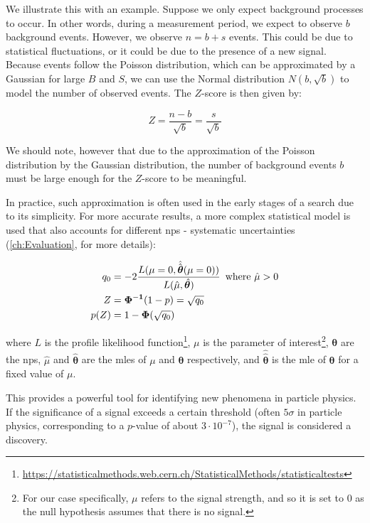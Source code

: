 We illustrate this with an example. Suppose we only expect background processes to occur. In other words, during a
measurement period, we expect to observe $b$ background events. However, we observe $n=b+s$ events. This
could be due to statistical fluctuations, or it could be due to the presence of a new signal. Because events follow the
Poisson distribution, which can be approximated by a Gaussian for large $B$ and $S$, we can use the Normal distribution
$N(b, \sqrt{b})$ to model the number of observed events. The $Z$-score is then given by:

\begin{equation}
    Z = \frac{n-b}{\sqrt{b}} = \frac{s}{\sqrt{b}}
\end{equation}

We should note, however that due to the approximation of the Poisson distribution by the Gaussian distribution, the
number of background events $b$ must be large enough for the $Z$-score to be meaningful.

In practice, such approximation is often used in the early stages of a search due to its simplicity. For more accurate
results, a more complex statistical model is used that also accounts for different \glspl{np} - systematic
uncertainties (\autoref{ch:Evaluation}, \cite{pract-stat-lhc, statistical} for more details):

\begin{align}
    q_0  & = -2 \frac{L(\mu=0, \hat{\hat{\bm{\theta}}}(\mu=0))}{L(\hat{\mu}, \hat{\bm{\theta}})} \, \text{ where $\hat{\mu} > 0$} \\
    Z    & = \mathbf{\Phi^{-1}}(1 - p) = \sqrt{q_0}                                                                                          \\
    p(Z) & = 1 - \mathbf{\Phi}(\sqrt{q_0})
\end{align}

where $L$ is the profile likelihood
function\footnote{\url{https://statisticalmethods.web.cern.ch/StatisticalMethods/statisticaltests}}, $\mu$ is the
parameter of interest\footnote{For our case specifically, $\mu$ refers to the signal strength, and so it is set to $0$
    as the null hypothesis assumes that there is no signal.}, $\bm{\theta}$ are the \glspl{np}, $\hat{\mu}$ and
$\hat{\bm{\theta}}$ are the \glspl{mle} of $\mu$ and $\bm{\theta}$ respectively, and $\hat{\hat{\bm{\theta}}}$ is the
\gls{mle} of $\bm{\theta}$ for a fixed value of $\mu$.

This provides a powerful tool for identifying new phenomena in particle physics. If the significance of a signal exceeds
a certain threshold (often $5\sigma$ in particle physics, corresponding to a $p$-value of about $3\cdot10^{-7}$), the
signal is considered a discovery.

